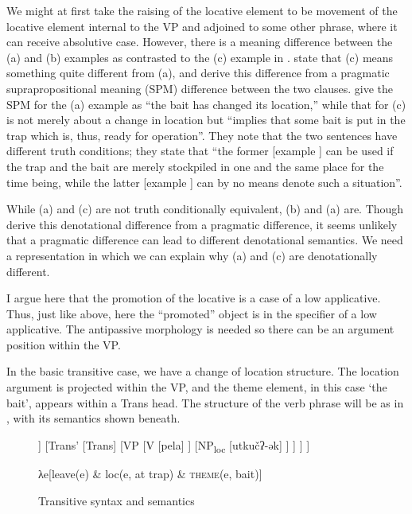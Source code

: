 \documentclass[output=paper,colorlinks,citecolor=brown,modfonts,nonflat]{langsci/langscibook}
\begin{document}
We might at first take the raising of the locative element to be movement of the locative element internal to the VP and adjoined to some other phrase, where it can receive absolutive case. However, there is a meaning difference between the (a) and (b) examples as contrasted to the (c) example in . \citet{KozinskyNedjalkovPolinskaja1988} state that (c) means something quite different from (a), and derive this difference from a pragmatic suprapropositional meaning (SPM) difference between the two clauses. \citet[684]{KozinskyNedjalkovPolinskaja1988} give the SPM for the (a) example as “the bait has changed its location,” while that for (c) is not merely about a change in location but “implies that some bait is put in the trap which is, thus, ready for operation”. They note that the two sentences have different truth conditions; they state that “the former [example ] can be used if the trap and the bait are merely stockpiled in one and the same place for the time being, while the latter [example ] can by no means denote such a situation”.

While (a) and (c) are not truth conditionally equivalent, (b) and (a) are. Though \citet{KozinskyNedjalkovPolinskaja1988} derive this denotational difference from a pragmatic difference, it seems unlikely that a pragmatic difference can lead to different denotational semantics. We need a representation in which we can explain why (a) and (c) are denotationally different.

I argue here that the promotion of the locative is a case of a low applicative. Thus, just like above, here the ``promoted'' object is in the specifier of a low applicative. The antipassive morphology is needed so there can be an argument position within the VP.

In the basic transitive case, we have a change of location structure. The location argument is projected within the VP, and the theme element, in this case ‘the bait’, appears within a Trans head. The structure of the verb phrase will be as in , with its semantics shown beneath.

\begin{figure}[p]
\small
	\begin{forest}
		[TransP
			[NP
				[təkečʔ-ən]
			]
			[Trans'
				[Trans]
				[VP
					[V
						[pela]
					]
					[NP\textsubscript{loc}
						[utkučʔ-ək]
					]
				]
			]
		]
	\end{forest}

λe[leave(e) \& loc(e, at trap) \& \textsc{theme}(e, bait)]
\caption{\label{fig:basilico:10}Transitive syntax and semantics}
\end{figure}
\end{document}
